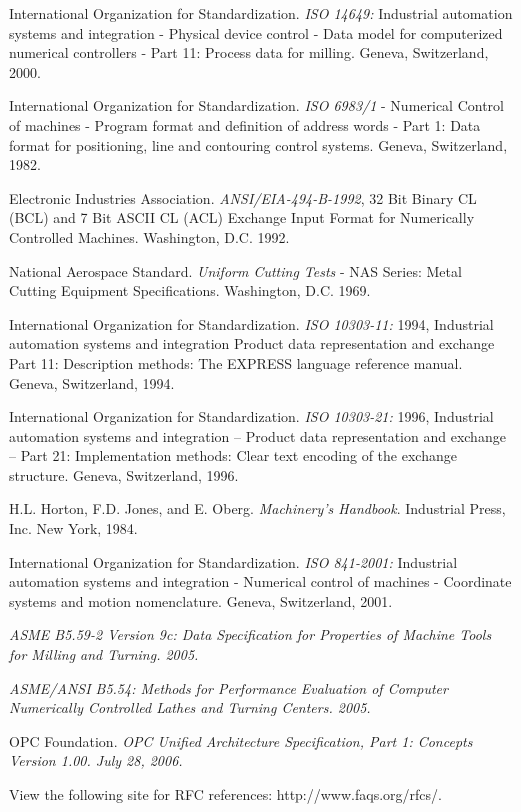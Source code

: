 \documentclass{mtconnect}	%
\begin{document}
International Organization for Standardization. \textit{ISO 14649:} Industrial automation systems and integration - Physical device control - Data model for computerized numerical controllers - Part 11: Process data for milling. Geneva, Switzerland, 2000.

International Organization for Standardization. \textit{ISO 6983/1} - Numerical Control of machines - Program format and definition of address words - Part 1: Data format for positioning, line and contouring control systems. Geneva, Switzerland, 1982.

Electronic Industries Association. \textit{ANSI/EIA-494-B-1992}, 32 Bit Binary CL (BCL) and 7 Bit ASCII CL (ACL) Exchange Input Format for Numerically Controlled Machines. Washington, D.C. 1992.

National Aerospace Standard. \textit{Uniform Cutting Tests} - NAS Series: Metal Cutting Equipment Specifications. Washington, D.C. 1969.

International Organization for Standardization. \textit{ISO 10303-11:} 1994, Industrial automation systems and integration  Product data representation and exchange  Part 11: Description methods: The EXPRESS language reference manual. Geneva, Switzerland, 1994.

International Organization for Standardization. \textit{ISO 10303-21:} 1996, Industrial automation systems and integration -- Product data representation and exchange -- Part 21: Implementation methods: Clear text encoding of the exchange structure. Geneva, Switzerland, 1996.

H.L. Horton, F.D. Jones, and E. Oberg. \textit{Machinery's Handbook}. Industrial Press, Inc. New York, 1984.

International Organization for Standardization. \textit{ISO 841-2001:} Industrial automation systems and integration - Numerical control of machines - Coordinate systems and motion nomenclature. Geneva, Switzerland, 2001.

\textit{ASME B5.59-2 Version 9c: Data Specification for Properties of Machine Tools for Milling and Turning. 2005.}

\textit{ASME/ANSI B5.54: Methods for Performance Evaluation of Computer Numerically Controlled Lathes and Turning Centers. 2005.}

OPC Foundation. \textit{OPC Unified Architecture Specification, Part 1: Concepts Version 1.00. July 28, 2006.}

View the following site for RFC references: http://www.faqs.org/rfcs/.
\end{document}
